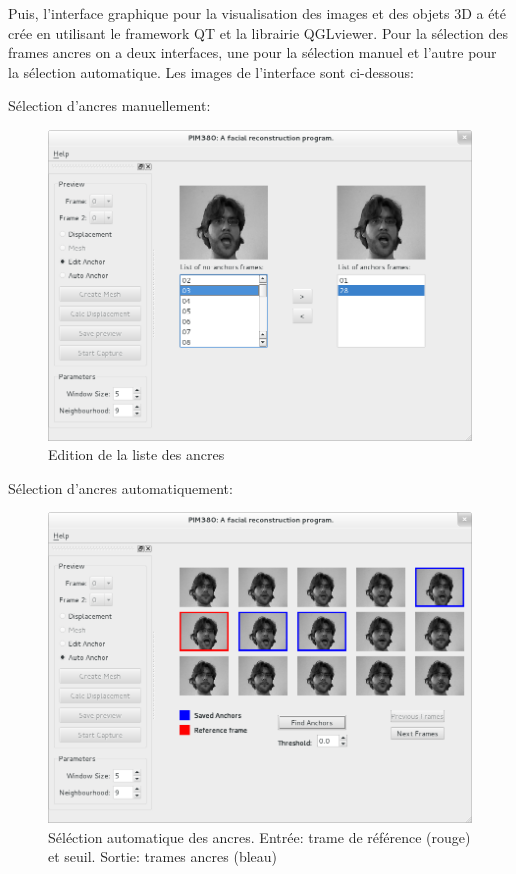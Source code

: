 \documentclass[a4paper,12pt]{article}
\begin{document}
Puis, l'interface graphique pour la visualisation des images et des
objets 3D a été crée en utilisant le framework QT et la librairie
QGLviewer. 
Pour la sélection des  frames ancres on a deux interfaces, une pour la
sélection manuel et l’autre pour la sélection automatique. Les images
de l’interface sont ci-dessous:

\newpage
Sélection d'ancres manuellement: 

\begin{figure}[ht!]
  \begin{center}
    \includegraphics[scale=0.35]{img/editAnchorList.png}
    \caption{Edition de la liste des ancres}
  \end{center}
\end{figure}

Sélection d'ancres automatiquement:

\begin{figure}[ht!]
  \begin{center}
    \includegraphics[scale=0.35]{img/AnchorAutomaticSelection.png}
    \caption{Séléction automatique des ancres. Entrée: trame de référence (rouge) et seuil. Sortie: trames ancres (bleau)}
  \end{center}
\end{figure}
\end{document}

